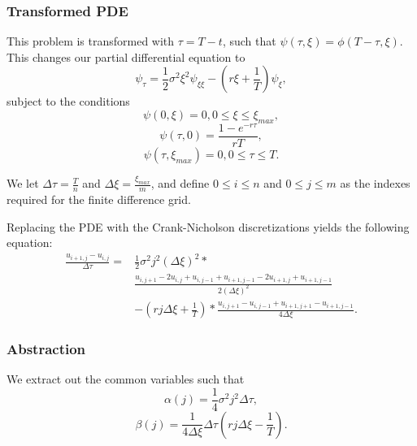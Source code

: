 \documentclass{beamer}
\begin{document}
  \begin{frame}
    \frametitle{Transformed PDE}
    This problem is transformed with \(\tau = T - t \), such that \(\psi(\tau, \xi) = \phi(T-\tau, \xi)\). This changes our partial differential equation to
    \begin{equation}
      \psi_\tau = \frac{1}{2}\sigma^2\xi^2\psi_{\xi\xi} - (r\xi + \frac{1}{T})\psi_\xi,
    \end{equation}
    subject to the conditions
    \begin{equation}
      \psi(0, \xi) = 0, 0 \le \xi \le \xi_{max},
    \end{equation}
    \begin{equation}
      \psi(\tau, 0) = \frac{1-e^{-r\tau}}{rT},
    \end{equation}
    \begin{equation}
      \psi(\tau, \xi_{max}) = 0, 0 \le \tau \le T.
    \end{equation}
  \end{frame}

  \begin{frame}
    We let \(\Delta\tau = \frac{T}{n}\) and \(\Delta\xi = \frac{\xi_{max}}{m}\), and define \(0 \le i \le n\) and \(0 \le j \le m\) as the indexes required for the finite difference grid.

    Replacing the PDE with the Crank-Nicholson discretizations yields the following equation:
    \begin{equation}
      \begin{split}
        \frac{u_{i+1, j} - u_{i, j}}{\Delta\tau} = & \frac{1}{2}\sigma^2j^2(\Delta\xi)^2 * \\ &  \frac{u_{i, j+1} - 2u_{i, j} + u_{i, j-1} + u_{i+1, j-1} -2u_{i+1, j} + u_{i+1, j-1}}{2(\Delta\xi)^2} \\ & - (rj\Delta\xi + \frac{1}{T}) * \frac{u_{i, j+1} - u_{i,j-1} +u_{i+1, j+1} - u_{i+1, j-1}}{4\Delta\xi}.
      \end{split}
    \end{equation}
  \end{frame}

  \begin{frame}
    \frametitle{Abstraction}
    We extract out the common variables such that
    \begin{equation}
      \alpha(j) = \frac{1}{4}\sigma^2j^2\Delta\tau,
    \end{equation}
    \begin{equation}
      \beta(j) = \frac{1}{4\Delta\xi}\Delta\tau(rj\Delta\xi - \frac{1}{T}).
    \end{equation}
  \end{frame}
\end{document}
